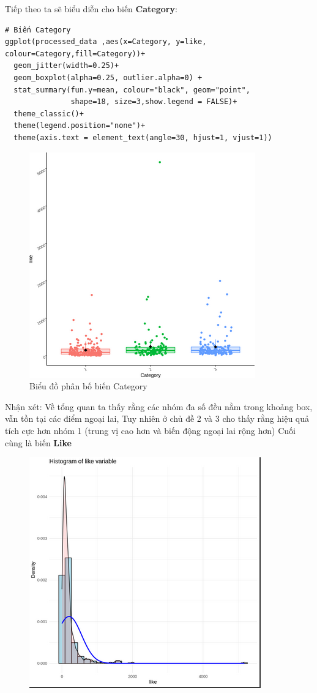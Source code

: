 \begin{itemize}
\begin{itemize}
        Tiếp theo ta sẽ biểu diễn cho biến \textbf{Category}:
        \begin{lstlisting}
# Biến Category
ggplot(processed_data ,aes(x=Category, y=like, colour=Category,fill=Category))+
  geom_jitter(width=0.25)+
  geom_boxplot(alpha=0.25, outlier.alpha=0) +
  stat_summary(fun.y=mean, colour="black", geom="point",
               shape=18, size=3,show.legend = FALSE)+
  theme_classic()+
  theme(legend.position="none")+
  theme(axis.text = element_text(angle=30, hjust=1, vjust=1))
        \end{lstlisting}
    \begin{figure}[H]
        \centering
        \includegraphics[width=0.8\linewidth]{part23_figures/05.png}
        \caption{Biểu đồ phân bố biến Category}
        \label{fig:Biểu đồ phân bố biến Category}
    \end{figure}
    Nhận xét: Về tổng quan ta thấy rằng các nhóm đa số đều nằm trong khoảng box, vẫn tồn tại các điểm ngoại lai, Tuy nhiên ở chủ đề 2 và 3 cho thấy rằng hiệu quả tích cực hơn nhóm 1 (trung vị cao hơn và biến động ngoại lai rộng hơn)
    Cuối cùng là biến \textbf{Like}
    \begin{figure}[H]
        \centering
        \includegraphics[width=0.8\linewidth]{part23_figures/03.png}

\end{figure}
\end{itemize}
\end{itemize}
